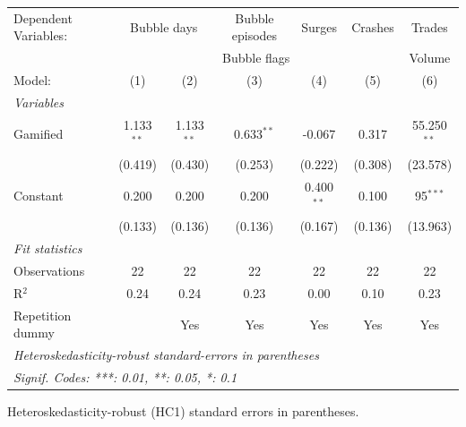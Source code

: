 \begingroup
\centering
\begin{tabular}{lcccccc}
   \tabularnewline \midrule \midrule
   Dependent Variables: & \multicolumn{2}{c}{Bubble days} & Bubble episodes & Surges & Crashes & Trades\\
    & \multicolumn{5}{c}{Bubble flags} & Volume \\ 
   Model:           & (1)          & (2)          & (3)          & (4)          & (5)     & (6)\\  
   \midrule
   \emph{Variables}\\
   Gamified         & 1.133$^{**}$ & 1.133$^{**}$ & 0.633$^{**}$ & -0.067       & 0.317   & 55.250$^{**}$\\   
                    & (0.419)      & (0.430)      & (0.253)      & (0.222)      & (0.308) & (23.578)\\   
   Constant         & 0.200        & 0.200        & 0.200        & 0.400$^{**}$ & 0.100   & 95$^{***}$\\   
                    & (0.133)      & (0.136)      & (0.136)      & (0.167)      & (0.136) & (13.963)\\   
   \midrule
   \emph{Fit statistics}\\
   Observations     & 22           & 22           & 22           & 22           & 22      & 22\\  
   R$^2$            & 0.24         & 0.24         & 0.23         & 0.00         & 0.10    & 0.23\\  
   Repetition dummy &              & Yes          & Yes          & Yes          & Yes     & Yes\\  
   \midrule \midrule
   \multicolumn{7}{l}{\emph{Heteroskedasticity-robust standard-errors in parentheses}}\\
   \multicolumn{7}{l}{\emph{Signif. Codes: ***: 0.01, **: 0.05, *: 0.1}}\\
\end{tabular}
 
\par \raggedright 
Heteroskedasticity-robust (HC1) standard errors in parentheses.
\par\endgroup
